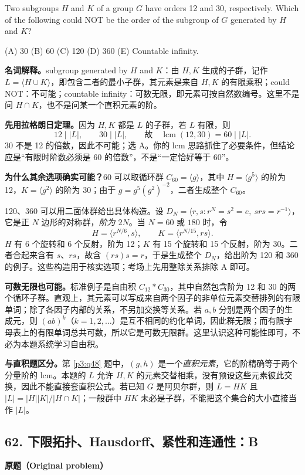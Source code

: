 \documentclass[11pt,a4paper,fontset=fandol]{ctexart}
\begin{document}
Two subgroups $H$ and $K$ of a group $G$ have orders 12 and 30, respectively. Which of the following could NOT be the order of the subgroup of $G$ generated by $H$ and $K$?

(A) 30 \quad (B) 60 \quad (C) 120 \quad (D) 360 \quad (E) Countable infinity.

\textbf{名词解释。}subgroup generated by $H$ and $K$：由 $H,K$ 生成的子群，记作 $L=\langle H\cup K\rangle$，即包含二者的最小子群，其元素是来自 $H,K$ 的有限乘积；could NOT：不可能；countable infinity：可数无限，即元素可按自然数编号。这里不是问 $H\cap K$，也不是问某一个直积元素的阶。

\textbf{先用拉格朗日定理。}因为 $H,K$ 都是 $L$ 的子群，若 $L$ 有限，则
\[
12\mid|L|,\qquad30\mid|L|,
\qquad\text{故}\quad\operatorname{lcm}(12,30)=60\mid|L|.
\]
30 不是 12 的倍数，因此不可能；选 A。你的 lcm 思路抓住了必要条件，但结论应是“有限时阶数必须是 60 的倍数”，不是“一定恰好等于 60”。

\textbf{为什么其余选项确实可能？}60 可以取循环群 $C_{60}=\langle g\rangle$，其中 $H=\langle g^5\rangle$ 的阶为 12，$K=\langle g^2\rangle$ 的阶为 30；由于 $g=g^5(g^2)^{-2}$，二者生成整个 $C_{60}$。

120、360 可以用二面体群给出具体构造。设 $D_N=\langle r,s:r^N=s^2=e,\ srs=r^{-1}\rangle$，它是正 $N$ 边形的对称群，\emph{阶为 $2N$}。当 $N=60$ 或 $180$ 时，令
\[
H=\langle r^{N/6},s\rangle,\qquad K=\langle r^{N/15},rs\rangle.
\]
$H$ 有 6 个旋转和 6 个反射，阶为 12；$K$ 有 15 个旋转和 15 个反射，阶为 30。二者合起来含有 $s$、$rs$，故含 $(rs)s=r$，于是生成整个 $D_N$，给出阶为 120 和 360 的例子。这些构造用于核实选项；考场上先用整除关系排除 A 即可。

\textbf{可数无限也可能。}标准例子是自由积 $C_{12}*C_{30}$，其中自然包含阶为 12 和 30 的两个循环子群。直观上，其元素可以写成来自两个因子的非单位元素交替排列的有限单词；除了各因子内部的关系，不另加交换等关系。若 $a,b$ 分别是两个因子的生成元，则 $(ab)^k$（$k=1,2,\ldots$）是互不相同的约化单词，因此群无限；而有限字母表上的有限单词总共可数，所以它是可数无限群。这里认识这种可能性即可，不必为本题系统学习自由积。

\textbf{与直积题区分。}第 \ref{p3:q48} 题中，$(g,h)$ 是一个\emph{直积元素}，它的阶精确等于两个分量阶的 lcm。本题的 $L$ 允许 $H,K$ 的元素交替相乘，没有预设这些元素彼此交换，因此不能直接套直积公式。若已知 $G$ 是阿贝尔群，则 $L=HK$ 且 $|L|=|H||K|/|H\cap K|$；一般群中 $HK$ 未必是子群，不能把这个集合的大小直接当作 $|L|$。

\subsection{62. 下限拓扑、Hausdorff、紧性和连通性：B}
\label{p3:q62}
\textbf{原题（Original problem）}
\end{document}
